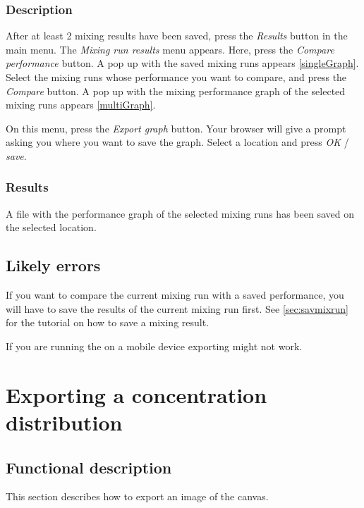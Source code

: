 \subsubsection{Description}
After at least 2 mixing results have been saved, press the \emph{Results} button in the main menu. The \emph{Mixing run results} menu appears. Here, press the \emph{Compare performance} button. A pop up with the saved mixing runs appears \ref{singleGraph}. Select the mixing runs whose performance you want to compare, and press the \emph{Compare} button.  A pop up with the mixing performance graph of the selected mixing runs appears \ref{multiGraph}.


On this menu, press the \emph{Export graph} button. Your browser will give a prompt asking you where you want to save the graph. Select a location and press \emph{OK} / \emph{save}.

\subsubsection{Results}
A file with the performance graph of the selected mixing runs has been saved on the selected location.

\subsection{Likely errors}
If you want to compare the current mixing run with a saved performance, you will have to save the results of the current mixing run first. See \ref{sec:savmixrun} for the tutorial on how to save a mixing result.

If you are running the \applicationname on a mobile device exporting might not work.


\section{Exporting a concentration distribution}
\label{sec:exportDist}

\subsection{Functional description}
This section describes how to export an image of the canvas.

